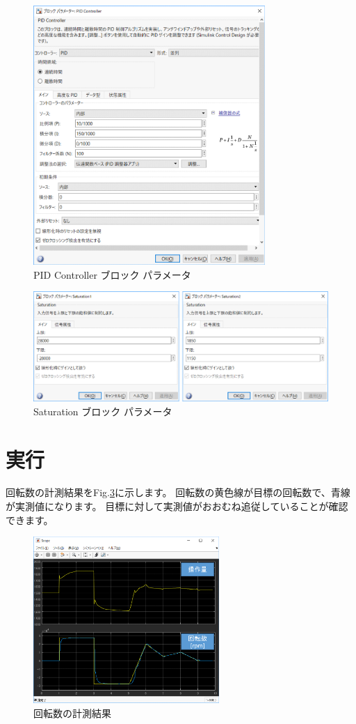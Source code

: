 \begin{figure}[htbp]
    \centering
    \includegraphics[width=250pt]{fig/fig403.eps}
    \caption{PID Controller ブロック パラメータ}
    \label{fig403}
\end{figure}

\begin{figure}[htbp]
    \centering
    \includegraphics[width=350pt]{fig/fig404.eps}
    \caption{Saturation ブロック パラメータ}
    \label{fig404}
\end{figure}


\section{実行}\label{ux30a2ux30fcux30e0ux69cbux6210ux306eux8a73ux7d30}

回転数の計測結果をFig.\ref{fig405}に示します。
回転数の黄色線が目標の回転数で、青線が実測値になります。
目標に対して実測値がおおむね追従していることが確認できます。

\begin{figure}[htbp]
    \centering
    \includegraphics[width=200pt]{fig/fig405.eps}
    \caption{回転数の計測結果}
    \label{fig405}
\end{figure}


